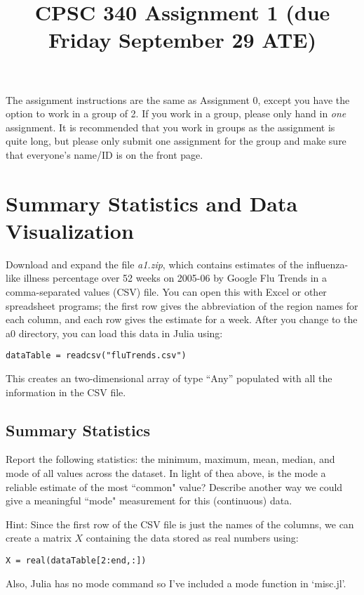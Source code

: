 \documentclass{article}
\def\blu#1{{\color{blu}#1}}
\begin{document}
\title{CPSC 340 Assignment 1 (due Friday September 29 ATE)}
\author{}
\date{}
\maketitle
\vspace{-4em}

The assignment instructions are the same as Assignment 0, except you have the option to work in a group of 2. If you work in a group, please only hand in \emph{one} assignment. It is recommended that you work in groups as the assignment is quite long, but please only submit one assignment for the group and make sure that everyone's name/ID is on the front page.


\section{Summary Statistics and Data Visualization}

Download and expand the file \emph{a1.zip}, which contains estimates of the influenza-like illness percentage over 52 weeks on 2005-06 by Google Flu Trends in a comma-separated values (CSV) file. You can open this with Excel or other spreadsheet programs; the first row gives the abbreviation of the region names for each column, and each row gives the estimate for a week.
After you change to the a0 directory, you can load this data in Julia using:
\begin{verbatim}
dataTable = readcsv("fluTrends.csv")
\end{verbatim}
This creates an two-dimensional array of type ``Any''  populated with all the information in the CSV file.

\subsection{Summary Statistics}

\blu{Report the following statistics}: the minimum, maximum, mean, median, and mode of all values across the dataset. In light of thea above, \blu{is the mode a reliable estimate of the most ``common" value? Describe another way we could give a meaningful ``mode" measurement for this (continuous) data.}

Hint: Since the first row of the CSV file is just the names of the columns, we can create a matrix $X$ containing the data stored as real numbers using:
\begin{verbatim}
X = real(dataTable[2:end,:])
\end{verbatim}
Also, Julia has no mode command so I've included a mode function in `misc.jl'.
\end{document}
